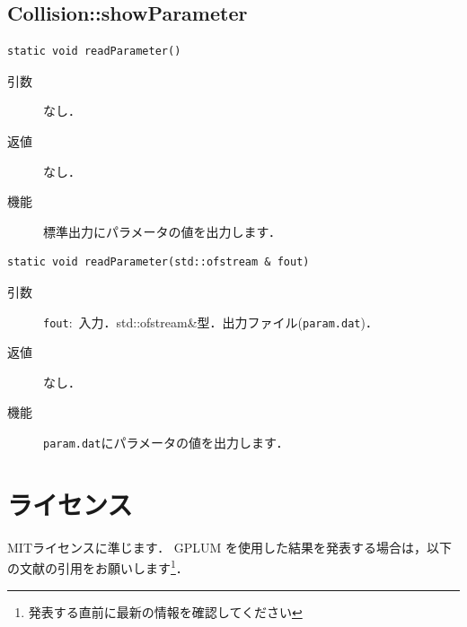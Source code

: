 \documentclass[12pt,a4paper,dvipdfmx]{jsarticle}
\newcommand{\ourcode}{GPLUM\xspace}
\newcommand{\Paper}{Ishigaki et al. (in prep., accepted in PASJ)\xspace}
\begin{document}
\subsection{Collision::showParameter}

\begin{screen}
\begin{verbatim}
static void readParameter()
\end{verbatim}
\end{screen}

\begin{description}
\item[引数]

なし．

\item[返値]

なし．
\item[機能]

標準出力にパラメータの値を出力します．

\end{description}


\begin{screen}
\begin{verbatim}
static void readParameter(std::ofstream & fout)
\end{verbatim}
\end{screen}

\begin{description}
\item[引数]

\texttt{fout}:\ 入力．std::ofstream\&型．出力ファイル(\texttt{param.dat})．

\item[返値]

なし．

\item[機能]

\texttt{param.dat}にパラメータの値を出力します．

\end{description}



\section{ライセンス}

MITライセンスに準じます．
\ourcode を使用した結果を発表する場合は，以下の文献の引用をお願いします\footnote{発表する直前に最新の情報を確認してください}．
\end{document}
